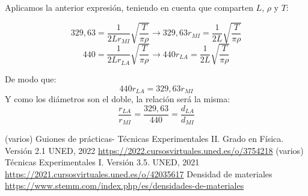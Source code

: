 \documentclass[a4paper,12pt,spanish]{article}
\begin{document}
Aplicamos la anterior expresión, teniendo en cuenta que comparten $L$, $\rho$ y $T$:

\[329,63 = \frac{1}{2Lr_{MI}}\sqrt{\frac{T}{\pi \rho}}\rightarrow 329,63 r_{MI} = \frac{1}{2L}\sqrt{\frac{T}{\pi \rho}}\]
\[ 440 = \frac{1}{2Lr_{LA}}\sqrt{\frac{T}{\pi \rho}}\rightarrow 440 r_{LA} = \frac{1}{2L}\sqrt{\frac{T}{\pi \rho}}
\]

De modo que:
\[ 440 r_{LA} = 329,63 r_{MI}
\]
Y como los diámetros son el doble, la relación será la misma:
\[ \frac{r_{LA}}{r_{MI}}= \frac{329,63}{440} = \frac{d_{LA}}{d_{MI}} \]



	\vspace{\baselineskip}
\begin{thebibliography}{3}


 (varios) Guiones de prácticas- Técnicas Experimentales II. Grado en Física. Versión 2.1  UNED, 2022 \url{https://2022.cursosvirtuales.uned.es/o/3754218}
 (varios) Técnicas Experimentales I. Versión 3.5.  UNED, 2021 \url{https://2021.cursosvirtuales.uned.es/o/42035617}
 Densidad de materiales \url{ https://www.stemm.com/index.php/es/densidades-de-materiales }



\end{thebibliography}
\end{document}
